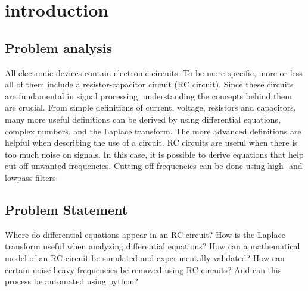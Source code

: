 \chapter{introduction}
\section{Problem analysis}
All electronic devices contain electronic circuits. To be more specific, more or less all of them include a resistor-capacitor circuit (RC circuit). Since these circuits are fundamental in signal processing, understanding the concepts behind them are crucial. From simple definitions of current, voltage, resistors and capacitors, many more useful definitions can be derived by using differential equations, complex numbers, and the Laplace transform. The more advanced definitions are helpful when describing the use of a circuit. RC circuits are useful when there is too much noise on signals. In this case, it is possible to derive equations that help cut off unwanted frequencies. Cutting off frequencies can be done using high- and lowpass filters. 
\section{Problem Statement}
Where do differential equations appear in an RC-circuit? How is the Laplace transform useful when analyzing differential equations? How can a mathematical model of an RC-circuit be simulated and experimentally validated? How can certain noise-heavy frequencies be removed using RC-circuits? And can this process be automated using python?